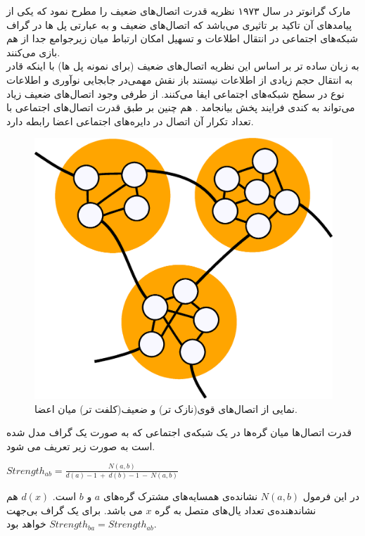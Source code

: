\begin {persian}
\noindent
مارک گرانوتر در سال ۱۹۷۳ نظریه قدرت اتصال‌های ضعیف \cite{granovetter_strength_1973} را مطرح نمود که ‌یکی از پیامد‌های آن تاکید بر تاثیری می‌باشد که اتصال‌های ضعیف و به عبارتی پل ‌‌ها در گراف شبکه‌های اجتماعی در انتقال اطلاعات و تسهیل امکان ارتباط میان زیرجوامع جدا از هم بازی می‌کنند.\\
\indent
به زبان ساده تر بر اساس این نظریه اتصال‌های ضعیف (برای نمونه پل ‌‌ها) با اینکه قادر به انتقال حجم زیادی از اطلاعات نیستند باز نقش مهمی‌در جابجایی نوآوری و اطلاعات نوع در سطح شبکه‌های اجتماعی ایفا می‌کنند. از طرفی وجود اتصال‌های ضعیف زیاد می‌تواند به کندی فرایند پخش بیانجامد \cite{guille_information_2013,sun_survey_2011}. هم چنین بر طبق قدرت اتصال‌های اجتماعی با تعداد تکرار آن اتصال در دایره‌های اجتماعی اعضا رابطه دارد.
 \begin{figure}[H]
 \centering
 \includegraphics[scale=0.29]{figures/swt}
 \caption[فرضیه قدرت‌های ضعیف]
 {نمایی از اتصال‌های قوی(نازک تر) و ضعیف(کلفت تر) میان اعضا.}
\end{figure}


قدرت اتصال‌ها میان گره‌ها در یک شبکه‌ی اجتماعی که به صورت یک گراف مدل شده است به صورت زیر تعریف می شود.
\begin{center}
 { $ Strength_{ab} = \frac{ N(a,b) }{d(a)-1 ~+~ d(b)-1 ~-~N(a,b) } $}

\end{center}
در این فرمول $N(a,b)$ نشانده‌ی همسایه‌های مشترک گره‌های $a$ و $b$ است. $d(x)$ هم نشاندهنده‌ی تعداد یال‌های متصل به گره $x$ می باشد. برای یک گراف بی‌جهت $Strength_{ba} = Strength_{ab}$ خواهد بود.

\end{persian}

